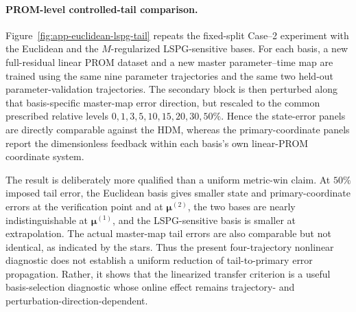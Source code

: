 \documentclass[11pt]{article}
\begin{document}
\begin{table}[H]
\centering
\caption{Oracle high-mode perturbation diagnostic for basis selection. Errors are averaged over $\bm\mu^{(v)}$, $\bm\mu^{(1)}$, $\bm\mu^{(2)}$; perturbed rows also average over five random seeds.}
\label{tab:metric-oracle-diagnostic}
\end{table}

\paragraph{PROM-level controlled-tail comparison.}
Figure~\ref{fig:app-euclidean-lspg-tail} repeats the fixed-split Case--2
experiment with the Euclidean and the $M$-regularized LSPG-sensitive bases.
For each basis, a new full-residual linear PROM dataset and a new master
parameter--time map are trained using the same nine parameter trajectories
and the same two held-out parameter-validation trajectories.  The secondary
block is then perturbed along that basis-specific master-map error direction,
but rescaled to the common prescribed relative levels
$0,1,3,5,10,15,20,30,50\%$.  Hence the state-error panels are directly
comparable against the HDM, whereas the primary-coordinate panels report the
dimensionless feedback within each basis's own linear-PROM coordinate system.

The result is deliberately more qualified than a uniform metric-win claim.
At $50\%$ imposed tail error, the Euclidean basis gives smaller state and
primary-coordinate errors at the verification point and at $\bm\mu^{(2)}$,
the two bases are nearly indistinguishable at $\bm\mu^{(1)}$, and the
LSPG-sensitive basis is smaller at extrapolation.  The actual master-map tail
errors are also comparable but not identical, as indicated by the stars.
Thus the present four-trajectory nonlinear diagnostic does not establish a
uniform reduction of tail-to-primary error propagation.  Rather, it shows
that the linearized transfer criterion is a useful basis-selection diagnostic
whose online effect remains trajectory- and perturbation-direction-dependent.
\end{document}
